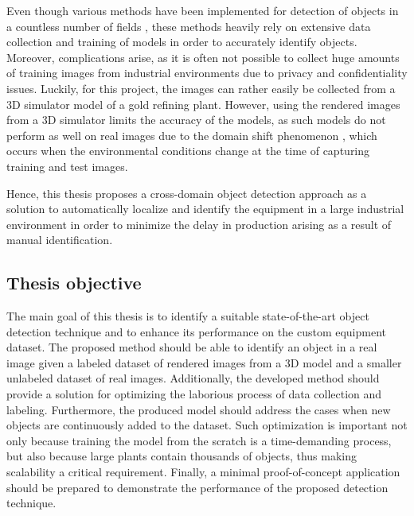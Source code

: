\documentclass[english, 12pt, a4paper, elec, utf8, a-1b, online]{aaltothesis}
\begin{document}
Even though various methods have been implemented for detection of objects in a countless number of fields \cite{ima, Liu2015, He2017, Redmon2015a, Zhang2021b, Tian2019}, these methods heavily rely on extensive data collection and training of models in order to accurately identify objects. Moreover, complications arise, as it is often not possible to collect huge amounts of training images from industrial environments due to privacy and confidentiality issues. Luckily, for this project, the images can rather easily be collected from a 3D simulator model of a gold refining plant. However, using the rendered images from a 3D simulator limits the accuracy of the models, as such models do not perform as well on real images due to the domain shift phenomenon \cite{Ganin2015}, which occurs when the environmental conditions change at the time of capturing training and test images. 

Hence, this thesis proposes a cross-domain object detection approach as a solution to automatically localize and identify the equipment in a large industrial environment in order to minimize the delay in production arising as a result of manual identification. 


\clearpage

\subsection{Thesis objective}
\label{objective} 
The main goal of this thesis is to identify a suitable state-of-the-art object detection technique and to enhance its performance on the custom equipment dataset. The proposed method should be able to identify an object in a real image given a labeled dataset of rendered images from a 3D model and a smaller unlabeled dataset of real images. Additionally, the developed method should provide a solution for optimizing the laborious process of data collection and labeling. Furthermore, the produced model should address the cases when new objects are continuously added to the dataset.  Such optimization is important not only because training the model from the scratch is a time-demanding process, but also because large plants contain thousands of objects, thus making scalability a critical requirement. Finally, a minimal proof-of-concept application should be prepared to demonstrate the performance of the proposed detection technique.  
\end{document}
